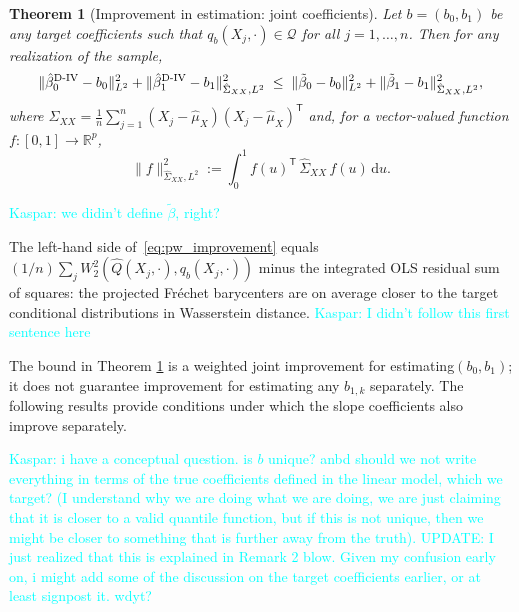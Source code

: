 \documentclass[12pt]{article}
\newcommand{\kw}[1]{\textcolor{cyan}{Kaspar: #1}}
\newcommand{\T}{\mathsf{T}} %
\newcommand{\est}{\ensuremath{\textnormal{D-IV}}\xspace}
\newcommand{\R}{\mathbb{R}} %
\newcommand{\dd}{\mathrm{d}} %
\newtheorem{theorem}{Theorem}
\begin{document}
\begin{theorem}[Improvement in estimation: joint coefficients]\label{thm:pw_ols_improvement}
Let $b=(b_0,b_1)$ be any target coefficients such that $q_b(X_j,\cdot)\in\mathcal Q$ for all $j=1,\ldots,n$. Then for any realization of the sample,
\begin{equation}\label{eq:pw_improvement}
\|\hat{\beta}_0^{\est} - b_0\|^2_{L^2} + \|\hat{\beta}_1^{\est} - b_1\|^2_{\hat{\Sigma}_{XX}, L^2} \;\leq\; \|\tilde{\beta}_0 - b_0\|^2_{L^2} + \|\tilde{\beta}_1 - b_1\|^2_{\hat{\Sigma}_{XX}, L^2},
\end{equation}
where $\hat{\Sigma}_{XX} = \frac{1}{n}\sum_{j=1}^n (X_j - \hat{\mu}_X)(X_j - \hat{\mu}_X)^{\!\T}$ and, for a vector-valued function $f\colon [0,1] \to \R^p$,
\[
\|f\|_{\hat{\Sigma}_{XX}, L^2}^2 := \int_0^1 f(u)^{\!\T}\, \hat{\Sigma}_{XX}\, f(u)\, \dd u.
\]
\end{theorem}
\kw{we didin't define $\tilde\beta$, right?}

The left-hand side of~\eqref{eq:pw_improvement} equals $(1/n)\sum_j W_2^2(\hat{Q}(X_j, \cdot), q_b(X_j, \cdot))$ minus the integrated OLS residual sum of squares: the projected Fr\'echet barycenters are on average closer to the target conditional distributions in Wasserstein distance. \kw{I didn't follow this first sentence here}

The bound in Theorem \ref{thm:pw_ols_improvement} is a weighted joint improvement for estimating$(b_0, b_1)$; it does not guarantee improvement for estimating any $b_{1,k}$ separately. The following results provide conditions under which the slope coefficients also improve separately. 

\kw{i have a conceptual question. is $b$ unique? anbd should we not write everything in terms of the true coefficients defined in the linear model, which we target? (I understand why we are doing what we are doing, we are just claiming that it is closer to a valid quantile function, but if this is not unique, then we might be closer to something that is further away from the truth). UPDATE: I just realized that this is explained in Remark 2 blow. Given my confusion early on, i might add some of the discussion on the target coefficients earlier, or at least signpost it. wdyt?}
\end{document}
